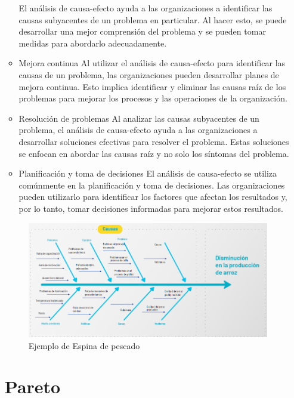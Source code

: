 \documentclass{article}
\theoremstyle{mytheoremstyle}
\theoremstyle{mytheoremstyle}
\theoremstyle{myproblemstyle}
\begin{document}
\begin{enumerate}
\begin{itemize}
		      El análisis de causa-efecto ayuda a las organizaciones a identiﬁcar las causas subyacentes de un problema en particular. Al hacer esto, se puede desarrollar una mejor comprensión del problema y se pueden tomar medidas para abordarlo adecuadamente.
				\item Mejora continua\newline
				Al utilizar el análisis de causa-efecto para identiﬁcar las causas de un problema, las organizaciones pueden desarrollar planes de mejora continua. Esto implica identiﬁcar y eliminar las causas raíz de los problemas para mejorar los procesos y las operaciones de la organización.
				\item Resolución de problemas\newline
				Al analizar las causas subyacentes de un problema, el análisis de causa-efecto ayuda a las organizaciones a desarrollar soluciones efectivas para resolver el problema. Estas soluciones se enfocan en abordar las causas raíz y no solo los síntomas del problema.
				\item Planiﬁcación y toma de decisiones\newline
				El análisis de causa-efecto se utiliza comúnmente en la planiﬁcación y toma de decisiones. Las organizaciones pueden utilizarlo para identiﬁcar los factores que afectan los resultados y, por lo tanto, tomar decisiones informadas para mejorar estos resultados.
			\end{itemize}
			\begin{figure}[H]
				\centering
				\includegraphics[width=1\textwidth]{espina2.png}
				\caption{Ejemplo de Espina de pescado}
				\label{fig:imagen2}
			\end{figure}
			\newpage

\section{Pareto}


\end{enumerate}
\end{document}
